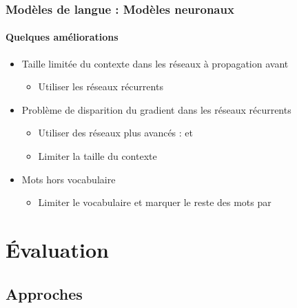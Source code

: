 \documentclass[xcolor=table]{beamer}
\begin{document}
\begin{frame}
\frametitle{Modèles de langue : Modèles neuronaux}
\framesubtitle{Quelques améliorations}

\begin{itemize}
	\item Taille limitée du contexte dans les réseaux à propagation avant
	\begin{itemize}
		\item Utiliser les réseaux récurrents
	\end{itemize}
	\item Problème de disparition du gradient dans les réseaux récurrents
	\begin{itemize}
		\item Utiliser des réseaux plus avancés :  et 
		\item Limiter la taille du contexte 
	\end{itemize}
	\item Mots hors vocabulaire
	\begin{itemize}
		\item Limiter le vocabulaire  et marquer le reste des mots par 
	\end{itemize}
\end{itemize}

\end{frame}

\section{Évaluation}

\subsection{Approches}
\end{document}
